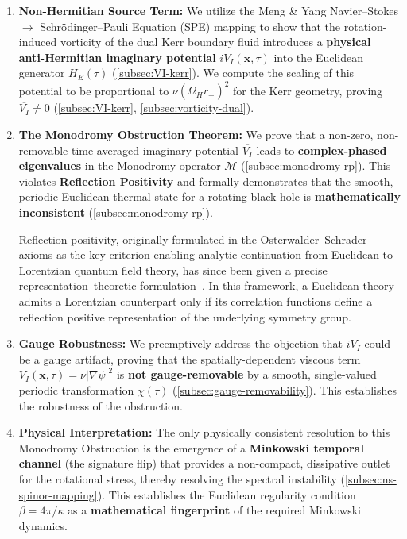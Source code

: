 \documentclass[11pt]{article}
\begin{document}
\begin{enumerate}
    \item \textbf{Non-Hermitian Source Term:} We utilize the Meng \& Yang Navier–Stokes $\to$ Schr\"odinger–Pauli Equation (SPE) mapping \cite{MengYang2024} to show that the rotation-induced vorticity of the dual Kerr boundary fluid introduces a \textbf{physical anti-Hermitian imaginary potential} $iV_I(\mathbf{x}, \tau)$ into the Euclidean generator $H_E(\tau)$ (\autoref{subsec:VI-kerr}). We compute the scaling of this potential to be proportional to $\nu(\Omega_H r_+)^2$ for the Kerr geometry, proving $\overline{V_I} \neq 0$ (\autoref{subsec:VI-kerr}, \autoref{subsec:vorticity-dual}).

   \item \textbf{The Monodromy Obstruction Theorem:} We prove that a non-zero, non-removable time-averaged imaginary potential $\overline{V_I}$ leads to \textbf{complex-phased eigenvalues} in the Monodromy operator $\mathcal{M}$ (\autoref{subsec:monodromy-rp}). This violates \textbf{Reflection Positivity\cite{OsterwalderSchrader1973}} and formally demonstrates that the smooth, periodic Euclidean thermal state for a rotating black hole is \textbf{mathematically inconsistent} (\autoref{subsec:monodromy-rp}).

   Reflection positivity, originally formulated in the Osterwalder--Schrader axioms as the key criterion enabling analytic continuation from Euclidean to Lorentzian quantum field theory, has since been given a precise representation--theoretic formulation~\cite{NeebOlafsson2018}.  In this framework, a Euclidean theory admits a Lorentzian counterpart only if its correlation functions define a reflection positive representation of the underlying symmetry group.

    \item \textbf{Gauge Robustness:} We preemptively address the objection that $iV_I$ could be a gauge artifact, proving that the spatially-dependent viscous term $V_I(\mathbf{x}, \tau) = \nu|\nabla\psi|^2$ is \textbf{not gauge-removable} by a smooth, single-valued periodic transformation $\chi(\tau)$ (\autoref{subsec:gauge-removability}). This establishes the robustness of the obstruction.

    \item \textbf{Physical Interpretation:} The only physically consistent resolution to this Monodromy Obstruction is the emergence of a \textbf{Minkowski temporal channel} (the signature flip) that provides a non-compact, dissipative outlet for the rotational stress, thereby resolving the spectral instability (\autoref{subsec:ns-spinor-mapping}). This establishes the Euclidean regularity condition $\beta = 4\pi/\kappa$ \cite{GibbonsHawking1977} as a \textbf{mathematical fingerprint} of the required Minkowski dynamics.
\end{enumerate}
\end{document}
